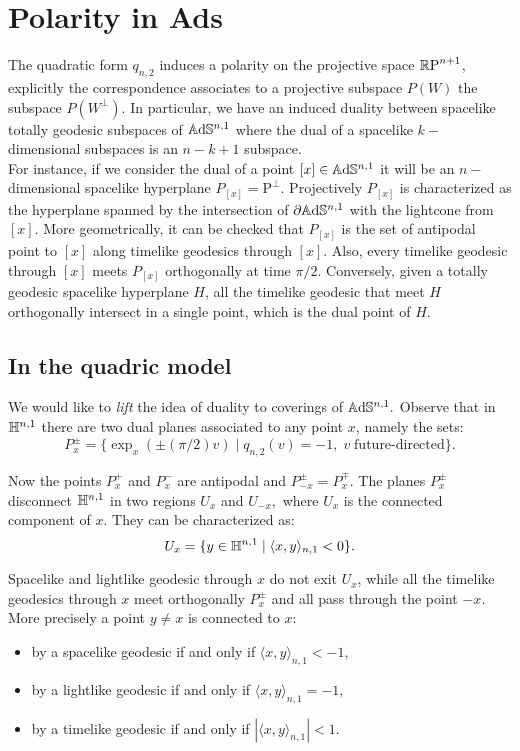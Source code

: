 \section{Polarity in Ads}\label{polarsec}
The quadratic form $q_{n,2}$ induces a polarity on the projective space $\mathbb{R}\text{P}^{n+1}$, explicitly the correspondence associates to a projective subspace $P(W)$ the subspace $P(W^\perp)$. In particular, we have an induced duality between spacelike totally geodesic subspaces of $\mathbb{A}\mathrm{d}\mathbb{S}^{n,1}$ where the dual of a spacelike $k-$dimensional subspaces is an $n-k+1$ subspace. \\
For instance, if we consider the dual of a point $[x]\in\mathbb{A}\mathrm{d}\mathbb{S}^{n,1}$ it will be an $n-$dimensional spacelike hyperplane $P_{[x]}=\text{P}^\perp.$ Projectively $P_{[x]}$ is characterized as the hyperplane spanned by the intersection of $\partial\mathbb{A}\mathrm{d}\mathbb{S}^{n,1}$  with the lightcone from $[x]$. More geometrically, it can be checked that $P_{[x]}$ is the set of antipodal point to $[x]$ along timelike geodesics through $[x].$ Also, every timelike geodesic through $[x]$ meets $P_{[x]}$ orthogonally at time $\pi/2.$ Conversely, given a totally geodesic spacelike hyperplane $H$, all the timelike geodesic that meet $H$ orthogonally intersect in a single point, which is the dual point of $H$.

\subsection*{In the quadric model} We would like to \textit{lift} the idea of duality to coverings of $\mathbb{A}\mathrm{d}\mathbb{S}^{n,1}.$ Observe that in $\mathbb{H}^{n,1}$ there are two dual planes associated to any point $x$, namely the sets: 
\[
    P_x^\pm=\{\exp_x(\pm(\pi/2)v)\;|\;q_{n,2}(v)=-1,\; v\;\text{future-directed}\}.
\] 

Now the points $P_x^+$ and $P_x^-$ are antipodal and $P_{-x}^\pm=P_x^\mp$. The planes $P_x^\pm$ disconnect $\mathbb{H}^{n,1}$ in two regions $U_x$ and $U_{-x},$ where $U_x$ is the connected component of $x$. They can be characterized as: 
\[
    U_x=\{y\in\mathbb{H}^{n,1}\;|\;\langle x,y\rangle_{n,1}<0\}.
\]

Spacelike and lightlike geodesic through $x$ do not exit $U_x$, while all the timelike geodesics through $x$ meet orthogonally $P_x^\pm$ and all pass through the point $-x$. More precisely a point $y\neq x$ is connected to $x$: 
\begin{itemize}
    \item by a spacelike geodesic if and only if $\langle x,y\rangle_{n,1}<-1,$
    \item by a lightlike geodesic if and only if $\langle x,y\rangle_{n,1}=-1,$
    \item by a timelike geodesic if and only if $|\langle x,y\rangle_{n,1}|<1.$ 
\end{itemize}

